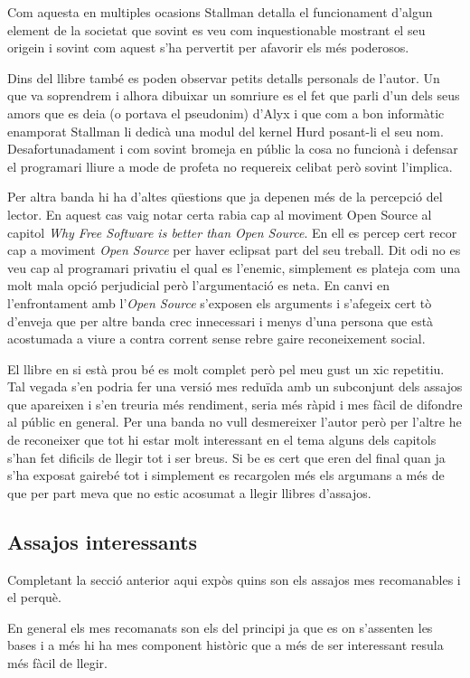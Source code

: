 \documentclass[a4paper,11pt]{scrartcl}
\begin{document}
Com aquesta en multiples ocasions Stallman detalla el funcionament d'algun element de la societat
que sovint es veu com inquestionable mostrant el seu origein i sovint com aquest s'ha pervertit
per afavorir els més poderosos.

Dins del llibre també es poden observar petits detalls personals de l'autor. Un que va soprendrem
i alhora dibuixar un somriure es el fet que parli d'un dels seus amors que es deia (o portava el pseudonim)
d'Alyx i que com a bon informàtic enamporat Stallman li dedicà una modul del kernel Hurd posant-li el seu nom.
Desafortunadament i com sovint bromeja en públic la cosa no funcionà i defensar el programari lliure
a mode de profeta no requereix celibat però sovint l'implica.

Per altra banda hi ha d'altes qüestions que ja depenen més de la percepció del lector. En aquest cas
vaig notar certa rabia cap al moviment Open Source al capitol \emph{Why Free Software is better than Open Source}.
En ell es percep cert recor cap a moviment \emph{Open Source} per haver eclipsat part del seu treball. Dit odi no es veu
cap al programari privatiu el qual es l'enemic, simplement es plateja com una molt mala opció perjudicial però
l'argumentació es neta. En canvi en l'enfrontament amb l'\emph{Open Source} s'exposen els arguments i s'afegeix cert
tò d'enveja que per altre banda crec innecessari i menys d'una persona que està acostumada a viure a contra corrent
sense rebre gaire reconeixement social.

El llibre en si està prou bé es molt complet però pel meu gust un xic repetitiu. Tal vegada s'en podria
fer una versió mes reduïda amb un subconjunt dels assajos que apareixen i s'en treuria més rendiment,
seria més ràpid i mes fàcil de difondre al públic en general. Per una banda no vull desmereixer l'autor
però per l'altre he de reconeixer que tot hi estar molt interessant en el tema alguns dels capitols
s'han fet dificils de llegir tot i ser breus. Si be es cert que eren del final quan ja s'ha exposat
gairebé tot i simplement es recargolen més els argumans a més de que per part meva que no estic acosumat
a llegir llibres d'assajos.

  \subsection{Assajos interessants}
Completant la secció anterior aqui expòs quins son els assajos mes recomanables i el perquè.

En general els mes recomanats son els del principi ja que es on s'assenten les bases i a més
hi ha mes component històric que a més de ser interessant resula més fàcil de llegir.





  
\end{document}
